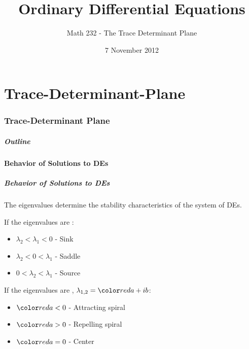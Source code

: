 \part{Trace-Determinant-Plane}
\section{Trace-Determinant Plane}


\title{Ordinary Differential Equations}
\subtitle{Math 232 - The Trace Determinant Plane}
\date{7 November 2012}

\begin{frame}
  \titlepage
\end{frame}

\begin{frame}
  \frametitle{Outline}
\end{frame}


\subsection{Behavior of Solutions to DEs}


\begin{frame}
  \frametitle{Behavior of Solutions to DEs}

  The eigenvalues determine the stability characteristics of the
  system of DEs.

  If the eigenvalues are :
  \begin{itemize}
  \item $\lambda_2 < \lambda_1 < 0$ - Sink
  \item $\lambda_2 < 0 < \lambda_1$ - Saddle
  \item $0 < \lambda_2 < \lambda_1$ - Source
  \end{itemize}

  If the eigenvalues are , $\lambda_{1,2}=\redText{a}+ib$:
  \begin{itemize}
  \item $\redText{a}<0$ - Attracting spiral
  \item $\redText{a}>0$ - Repelling spiral
  \item $\redText{a}=0$ - Center
  \end{itemize}

\end{frame}

